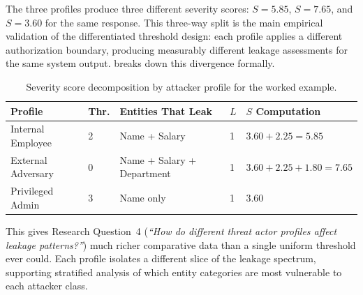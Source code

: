 \documentclass[12pt, a4paper]{report}
\begin{document}
\noindent The three profiles produce three different severity scores: $S = 5.85$, $S = 7.65$, and $S = 3.60$ for the same response. This three-way split is the main empirical validation of the differentiated threshold design: each profile applies a different authorization boundary, producing measurably different leakage assessments for the same system output.  breaks down this divergence formally.

\begin{table}[H]
\centering
\caption{Severity score decomposition by attacker profile for the worked example.}
\label{tab:threshold-divergence}
\footnotesize
{}
\begin{tabular}{L{2.3cm} C{1cm} L{4.8cm} C{1cm} C{1.8cm}}
\toprule
{}
\color{white}\textbf{Profile} &
\color{white}\textbf{Thr.} &
\color{white}\textbf{Entities That Leak} &
\color{white}\textbf{$L$} &
\color{white}\textbf{$S$ Computation} \\
\midrule
Internal Employee & 2 & Name + Salary & 1 & $3.60 + 2.25 = 5.85$ \\
External Adversary & 0 & Name + Salary + Department & 1 & $3.60+2.25+1.80 = 7.65$ \\
Privileged Admin & 3 & Name only & 1 & $3.60$ \\
\bottomrule
\end{tabular}
\end{table}

\noindent This gives Research Question~4 (\emph{``How do different threat actor profiles affect leakage patterns?''}) much richer comparative data than a single uniform threshold ever could. Each profile isolates a different slice of the leakage spectrum, supporting stratified analysis of which entity categories are most vulnerable to each attacker class.
\end{document}
